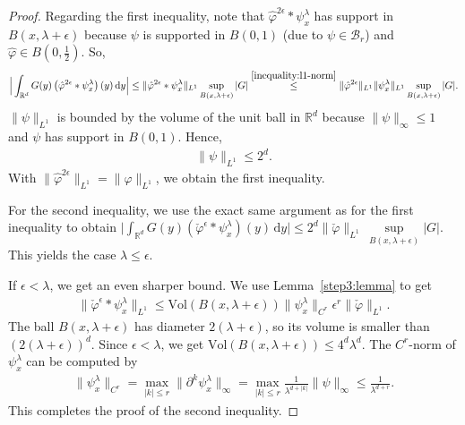 \begin{proof}
    Regarding the first inequality, note that \(\hat \varphi^{2\epsilon} * \psi^\lambda_x\) has support in \(B(x, \lambda + \epsilon)\) because \(\psi\) is supported in \(B(0,1)\) (due to \(\psi \in \mathcal{B}_r\)) and \(\hat \varphi \in B(0, \frac{1}{2})\). So, 
    \begin{align*}
        \Big| \int_{\mathbb{R}^d} G(y) \left( \hat \varphi^{2\epsilon} * \psi^\lambda_x \right) (y) \, \mathrm{d}y \Big| \leq \lVert \hat \varphi^{2\epsilon} * \psi^\lambda_x \rVert_{L^1} \sup_{B(x, \lambda + \epsilon)}|G| \overset{\eqref{inequality:l1-norm}}{\leq} \lVert \hat \varphi^{2\epsilon} \rVert_{L^1} \lVert \psi^\lambda_x \rVert_{L^1} \sup_{B(x, \lambda + \epsilon)}|G|.
    \end{align*}
    \(\lVert \psi \rVert_{L^1}\) is bounded by the volume of the unit ball in \(\mathbb{R}^d\) because \(\lVert \psi \rVert_{\infty} \leq 1\) and \(\psi\) has support in \(B(0,1)\). Hence, 
    \begin{align}\label{bound-psi-l1}
        \lVert \psi \rVert_{L^1} \leq 2^d.
    \end{align}
    With \(\lVert \hat \varphi^{2\epsilon} \rVert_{L^1} = \lVert \hat \varphi\rVert_{L^1}\), we obtain the first inequality.

    For the second inequality, we use the exact same argument as for the first inequality to obtain \(\Big| \int_{\mathbb{R}^d} G(y) \left( \check \varphi^{\epsilon} * \psi^\lambda_x \right) (y) \, \mathrm{d}y \Big| \leq 2^d \lVert \check \varphi \rVert_{L^1} \,  \sup\limits_{B(x, \lambda + \epsilon)}|G|\). This yields the case \(\lambda \leq \epsilon\). 
    
    If \(\epsilon < \lambda\), we get an even sharper bound. We use Lemma~\ref{step3:lemma} to get  
    \begin{align*}
        \lVert \check \varphi^{\epsilon} * \psi^\lambda_x \rVert_{L^1} \leq \mathrm{Vol}(B(x, \lambda + \epsilon)) \lVert \psi^\lambda_x \rVert_{C^r} \epsilon^r \lVert \check \varphi \rVert_{L^1}.
    \end{align*}
    The ball \(B(x,\lambda  + \epsilon)\) has diameter \(2(\lambda + \epsilon)\), so its volume is smaller than \((2(\lambda + \epsilon))^d\). Since \(\epsilon < \lambda\), we get \(\mathrm{Vol}(B(x,\lambda  + \epsilon)) \leq 4^d \lambda^d\). The \(C^r\)-norm of \(\psi^\lambda_x\) can be computed by
    \begin{align*}
        \lVert \psi^\lambda_x \rVert_{C^r} = \max_{|k| \leq r} \lVert \partial^k \psi^\lambda_x \rVert_{\infty} =  \max_{|k| \leq r} \frac{1}{\lambda^{d + |k|}} \lVert \psi \rVert_{\infty} \leq \frac{1}{\lambda^{d + r}}.
    \end{align*}    
    This completes the proof of the second inequality.
\end{proof}

